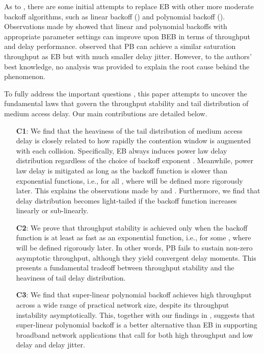 \documentclass[journal]{IEEEtran}
\begin{document}
As to , there are some initial attempts to replace EB with other more moderate backoff algorithms, such as linear backoff () and polynomial backoff ()\cite{1987:Hastad,2008:Xu,2011:Sun}. Observations made by \cite{2008:Xu} showed that linear and polynomial backoffs with appropriate parameter settings can improve upon BEB in terms of throughput and delay performance. \cite{2011:Sun} observed that PB can achieve a similar saturation throughput as EB but with much smaller delay jitter. However, to the authors' best knowledge, no analysis was provided to explain the root cause behind the phenomenon.

To fully address the important questions , this paper attempts to uncover the fundamental laws that govern the throughput stability and tail distribution of medium access delay. Our main contributions are detailed below.
\begin{itemize}
  \item[\textbf{C1}:] We find that the heaviness of the tail distribution of medium access delay is closely related to how rapidly the contention window is augmented with each collision. Specifically, EB always induces power law delay distribution regardless of the choice of backoff exponent . Meanwhile, power law delay is mitigated as long as the backoff function is slower than exponential functions, i.e.,  for all , where  will be defined more rigorously later. This explains the observations made by \cite{2008:Xu} and \cite{2011:Sun}. Furthermore, we find that delay distribution becomes light-tailed if the backoff function increases linearly or sub-linearly.
  \item[\textbf{C2}:] We prove that throughput stability is achieved only when the backoff function is at least as fast as an exponential function, i.e.,  for some , where  will be defined rigorously later. In other words, PB fails to sustain non-zero asymptotic throughput, although they yield convergent delay moments. This presents a fundamental tradeoff between throughput stability and the heaviness of tail delay distribution.
  \item[\textbf{C3}:] We find that super-linear polynomial backoff achieves high throughput across a wide range of practical network size, despite its throughput instability asymptotically. This, together with our findings in , suggests that super-linear polynomial backoff is a better alternative than EB in supporting broadband network applications that call for both high throughput and low delay and delay jitter.
  \end{itemize}
\end{document}
